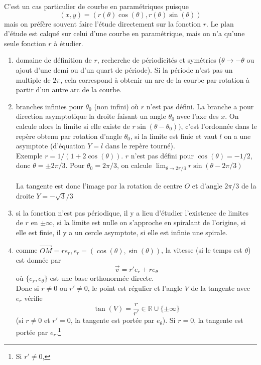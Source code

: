 \documentclass[a4paper,11pt]{article}
\begin{document}
\begin{giacjshere}
C'est un cas particulier de courbe en param\'etriques puisque
$$ (x,y)=(r(\theta) \cos(\theta), r(\theta) \sin(\theta))$$
mais on pr\'ef\`ere souvent faire l'\'etude directement sur la
fonction $r$. Le plan d'\'etude est calqu\'e sur celui
d'une courbe en param\'etrique, mais on n'a qu'une seule fonction
$r$ \`a \'etudier.
\begin{enumerate}
\item domaine de d\'efinition de $r$, recherche
de p\'eriodicit\'es et sym\'etries ($\theta \rightarrow -\theta$
ou ajout d'une demi ou d'un quart de p\'eriode).
Si la période n'est pas un multiple de $2\pi$, cela correspond
à obtenir un arc de la courbe par rotation à partir d'un autre arc
de la courbe.
\item branches infinies pour $\theta_0$ (non infini)
où $r$ n'est pas d\'efini. La branche a pour direction
asymptotique la droite faisant un angle $\theta_0$ avec
l'axe des $x$. On calcule alors la limite si elle existe de 
$r \sin(\theta-\theta_0))$, c'est l'ordonnée dans
le repère obtenu par rotation d'angle $\theta_0$, si la limite
est finie et vaut $l$
on a une asymptote (d'équation $Y=l$ dans le repère tourné).\\
Exemple $r=1/(1+2\cos(\theta))$. $r$ n'est pas d\'efini pour
$\cos(\theta)=-1/2$, donc $\theta=\pm 2\pi/3$. Pour $\theta_0=2\pi/3$,
on calcule $\lim_{\theta \rightarrow 2\pi/3}r\sin(\theta-2\pi/3)$\\
\\
La tangente est donc l'image par la rotation de centre $O$ et d'angle
$2\pi/3$ de la droite $Y=-\sqrt{3}/3$
\item si la fonction n'est pas périodique, il y a lieu
d'étudier l'existence de limites de $r$ en $\pm \infty$, si la limite
est nulle on s'approche en spiralant de l'origine, si
elle est finie, il y a un cercle asymptote, si elle est
infinie une spirale.
\item comme $\overrightarrow{OM}=r e_r, 
e_r=(\cos(\theta),\sin(\theta))$, 
la vitesse (si le temps est $\theta$) est donnée par 
$$\overrightarrow{v}= r' e_r + r e_\theta$$
où $\{ e_r,e_\theta \}$ est une base orthonormée directe.\\
Donc si $r\neq 0$ ou $r' \neq 0$, le point est régulier et
l'angle $V$ de la tangente avec $e_r$ vérifie 
$$\tan(V)=\frac{r}{r'} \in \mathbb{R} \cup \{ \pm \infty \} $$
(si $r \neq 0$ et $r'=0$, la tangente est portée par $e_\theta$).
Si $r=0$, la tangente est portée par $e_r$.\footnote{Si $r'\neq 0$,
}
\end{enumerate}
\end{giacjshere}
\end{document}
